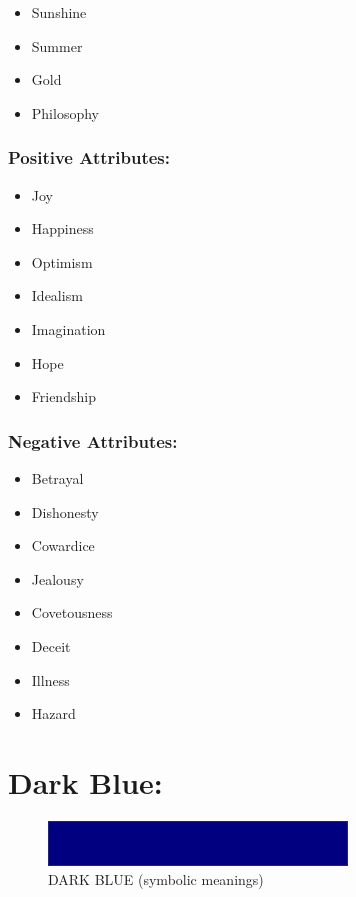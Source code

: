 \documentclass[openleft,oneside,showtrims]{memoir}
\begin{document}
\begin{itemize}
\item Sunshine
\item Summer
\item Gold
\item Philosophy
\end{itemize}

\subsubsection*{Positive Attributes:}
\label{sec:org992845e}

\begin{itemize}
\item Joy
\item Happiness
\item Optimism
\item Idealism
\item Imagination
\item Hope
\item Friendship
\end{itemize}

\subsubsection*{Negative Attributes:}
\label{sec:org491f6da}

\begin{itemize}
\item Betrayal
\item Dishonesty
\item Cowardice
\item Jealousy
\item Covetousness
\item Deceit
\item Illness
\item Hazard
\end{itemize}

\section{Dark Blue:}
\label{sec:orge00220c}

\begin{figure}[htbp]
\centering
\includegraphics[width=300px]{./media/dark-blue-banner.png}
\caption{\label{fig:HAP-WR-005}DARK BLUE (symbolic meanings)}
\end{figure}
\end{document}
